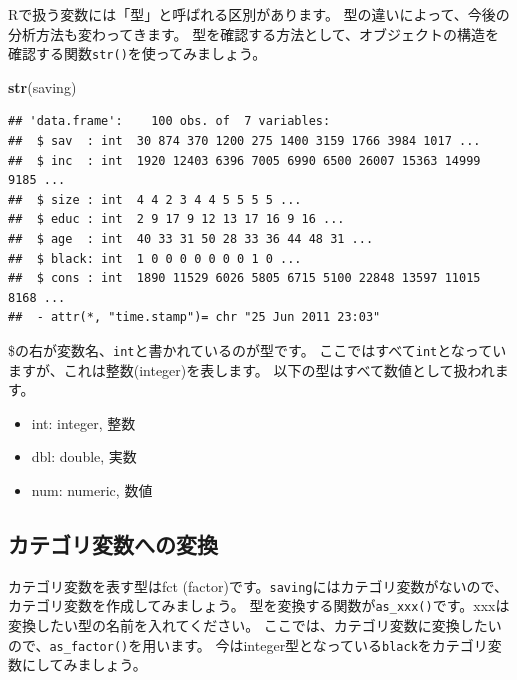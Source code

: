 \documentclass[]{book}
\newenvironment{Shaded}{\begin{snugshade}}{\end{snugshade}}
\newcommand{\KeywordTok}[1]{\textcolor[rgb]{0.13,0.29,0.53}{\textbf{#1}}}
\newcommand{\DataTypeTok}[1]{\textcolor[rgb]{0.13,0.29,0.53}{#1}}
\newcommand{\StringTok}[1]{\textcolor[rgb]{0.31,0.60,0.02}{#1}}
\newcommand{\OperatorTok}[1]{\textcolor[rgb]{0.81,0.36,0.00}{\textbf{#1}}}
\newcommand{\NormalTok}[1]{#1}
\providecommand{\tightlist}{%
  \setlength{\itemsep}{0pt}\setlength{\parskip}{0pt}}
\begin{document}
Rで扱う変数には「型」と呼ばれる区別があります。
型の違いによって、今後の分析方法も変わってきます。
型を確認する方法として、オブジェクトの構造を確認する関数\texttt{str()}を使ってみましょう。

\begin{Shaded}
\begin{Highlighting}[]
\KeywordTok{str}\NormalTok{(saving)}
\end{Highlighting}
\end{Shaded}

\begin{verbatim}
## 'data.frame':    100 obs. of  7 variables:
##  $ sav  : int  30 874 370 1200 275 1400 3159 1766 3984 1017 ...
##  $ inc  : int  1920 12403 6396 7005 6990 6500 26007 15363 14999 9185 ...
##  $ size : int  4 4 2 3 4 4 5 5 5 5 ...
##  $ educ : int  2 9 17 9 12 13 17 16 9 16 ...
##  $ age  : int  40 33 31 50 28 33 36 44 48 31 ...
##  $ black: int  1 0 0 0 0 0 0 0 1 0 ...
##  $ cons : int  1890 11529 6026 5805 6715 5100 22848 13597 11015 8168 ...
##  - attr(*, "time.stamp")= chr "25 Jun 2011 23:03"
\end{verbatim}

\$の右が変数名、\texttt{int}と書かれているのが型です。
ここではすべて\texttt{int}となっていますが、これは整数(integer)を表します。
以下の型はすべて数値として扱われます。

\begin{itemize}
\tightlist
\item
  int: integer, 整数
\item
  dbl: double, 実数
\item
  num: numeric, 数値
\end{itemize}

\subsection{カテゴリ変数への変換}\label{ux30abux30c6ux30b4ux30eaux5909ux6570ux3078ux306eux5909ux63db}

カテゴリ変数を表す型はfct
(factor)です。\texttt{saving}にはカテゴリ変数がないので、カテゴリ変数を作成してみましょう。
型を変換する関数が\texttt{as\_xxx()}です。xxxは変換したい型の名前を入れてください。
ここでは、カテゴリ変数に変換したいので、\texttt{as\_factor()}を用います。
今はinteger型となっている\texttt{black}をカテゴリ変数にしてみましょう。

\begin{Shaded}
\end{Shaded}
\end{document}
